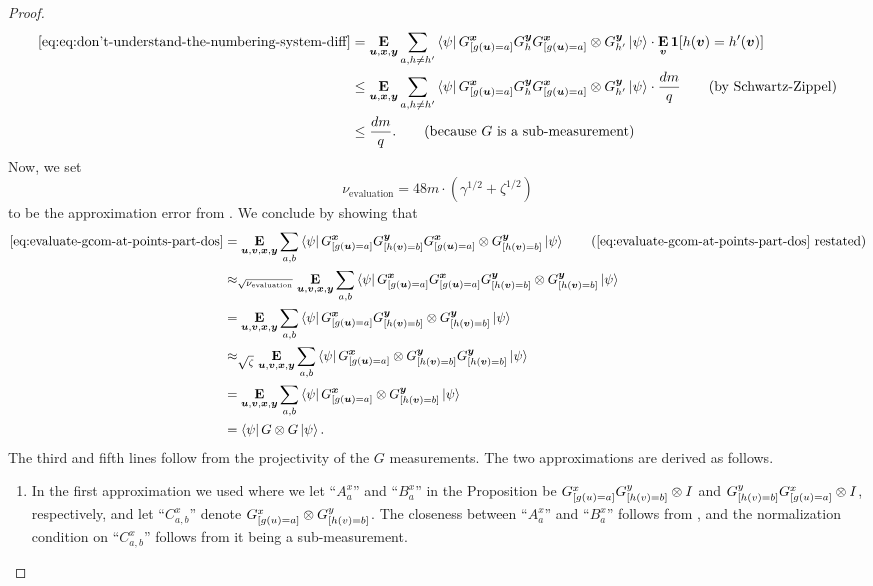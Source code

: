 \begin{proof}
\begin{align*}
\eqref{eq:eq:don't-understand-the-numbering-system-diff}
& = \mathop{\bf E\/}_{\boldsymbol{u}, {\boldsymbol{x}},\boldsymbol{y}} \sum_{a,h\neq h'} \bra{\psi} G^{{\boldsymbol{x}}}_{[g(\boldsymbol{u}) = a]} G^{\boldsymbol{y}}_h G^{{\boldsymbol{x}}}_{[g(\boldsymbol{u}) = a]} \otimes G^{\boldsymbol{y}}_{h'} \ket{\psi} \cdot \mathop{\bf E\/}_{\boldsymbol{v}} \boldsymbol{1}[h(\boldsymbol{v}) = h'(\boldsymbol{v})]\\
& \leq \mathop{\bf E\/}_{\boldsymbol{u}, {\boldsymbol{x}},\boldsymbol{y}} \sum_{a,h\neq h'} \bra{\psi} G^{{\boldsymbol{x}}}_{[g(\boldsymbol{u}) = a]} G^{\boldsymbol{y}}_h G^{{\boldsymbol{x}}}_{[g(\boldsymbol{u}) = a]} \otimes G^{\boldsymbol{y}}_{h'} \ket{\psi} \cdot \frac{dm}{q} \tag{by Schwartz-Zippel}\\
& \leq \frac{dm}{q}. \tag{because~$G$ is a sub-measurement}
\end{align*}
Now, we set
\begin{equation*}
\nu_{\mathrm{evaluation}} = 48 m \cdot (\gamma^{1/2} + \zeta^{1/2})
\end{equation*}
to be the approximation error from .
We conclude by showing that
\begin{align*}
	\eqref{eq:evaluate-gcom-at-points-part-dos} &= \E_{\bu,\bv,\bx,\by} \sum_{a,b} \bra{\psi} G^{\bx}_{[g(\bu) = a]} G^{\by}_{[h(\bv) = b]} G^{\bx}_{[g(\bu) = a]} \ot G^{\by}_{[h(\bv) = b]} \ket{\psi} \tag{\Cref{eq:evaluate-gcom-at-points-part-dos} restated}\\
	&\approx_{\sqrt{\nu_{\mathrm{evaluation}}}} \E_{\bu,\bv,\bx,\by} \sum_{a,b} \bra{\psi} G^{\bx}_{[g(\bu) = a]} G^{\bx}_{[g(\bu) = a]} G^{\by}_{[h(\bv) = b]}  \ot G^{\by}_{[h(\bv) = b]} \ket{\psi} \\
	&= \E_{\bu,\bv,\bx,\by} \sum_{a,b} \bra{\psi} G^{\bx}_{[g(\bu) = a]} G^{\by}_{[h(\bv) = b]}  \ot G^{\by}_{[h(\bv) = b]} \ket{\psi} \\
	&\approx_{\sqrt{\zeta}} \E_{\bu,\bv,\bx,\by} \sum_{a,b} \bra{\psi} G^{\bx}_{[g(\bu) = a]} \ot G^{\by}_{[h(\bv) = b]} G^{\by}_{[h(\bv) = b]} \ket{\psi} \\
	&= \E_{\bu,\bv,\bx,\by} \sum_{a,b} \bra{\psi} G^{\bx}_{[g(\bu) = a]} \ot G^{\by}_{[h(\bv) = b]} \ket{\psi} \\
	&= \bra{\psi} G \ot G \ket{\psi}.
\end{align*}
The third and fifth lines follow from the projectivity of the $G$ measurements.
The two approximations are derived as follows.
\begin{enumerate}
\item
In the first approximation we used  where we let ``$A^x_a$'' and ``$B^x_a$'' in the Proposition be $G^x_{[g(u)=a]} G^y_{[h(v)=b]} \otimes I$ and $G^y_{[h(v)=b]}  G^x_{[g(u) = a]} \otimes I$, respectively, and let ``$C^x_{a,b}$'' denote $G^x_{[g(u)=a]} \otimes G^y_{[h(v)=b]}$. The closeness between ``$A^x_a$'' and ``$B^x_a$'' follows from , and the normalization condition on ``$C^x_{a,b}$'' follows from it being a sub-measurement.

\end{enumerate}
\end{proof}
